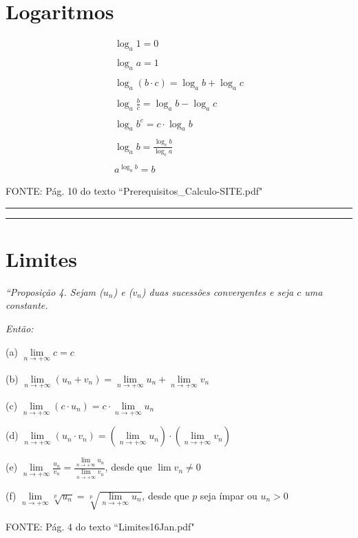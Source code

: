 \documentclass[portuguese,a4paper,12pt,onecolumn,fleqn]{article}
\newcommand{\myline}{\par
  \kern3pt %
  \hrule height 1.5pt
  \kern2pt %
  \hrule height 0.8pt
  \kern3pt %
}
\begin{document}
\section*{Logaritmos}

\begin{gather*}
\log_a 1 = 0
\\
\\
\log_a a = 1
\\
\\
\log_a (b \cdot c) = \log_a b + \log_a c
\\
\\
\log_a \frac{b}{c} = \log_a b - \log_a c
\\
\\
\log_a b^c = c \cdot \log_a b
\\
\\
\log_a b = \frac{\log_c b}{\log_c a}
\\
\\
a^{\log_a b} = b
\end{gather*}


FONTE: Pág. 10 do texto ``Prerequisitos\_Calculo-SITE.pdf"


\myline	%

\section*{Limites}

\textit{``Proposição 4. Sejam ($u_n$) e ($v_n$) duas sucessões convergentes e seja $c$ uma constante.}

\textit{Então:}

(a) $\lim\limits_{n \to +\infty} c = c$

(b) $\lim\limits_{n \to +\infty}(u_n + v_n ) = \lim\limits_{n \to +\infty}u_n + \lim\limits_{n \to +\infty}v_n$

(c) $\lim\limits_{n \to +\infty}(c \cdot u_n ) = c \cdot \lim\limits_{n \to +\infty}u_n$

(d) $\lim\limits_{n \to +\infty}(u_n \cdot v_n ) = (\lim\limits_{n \to +\infty}u_n) \cdot (\lim\limits_{n \to +\infty}v_n)$

(e)	$\lim\limits_{n \to +\infty}\frac{u_n}{v_n} = \frac{\lim\limits_{n \to +\infty}u_n}{\lim\limits_{n \to +\infty}v_n}$, 
desde que $\lim v_n \ne 0$

(f) $\lim\limits_{n \to +\infty}\sqrt[p]{u_n} = \sqrt[p]{\lim\limits_{n \to +\infty} u_n}$, desde que $p$ seja ímpar ou $u_n > 0$

FONTE: Pág. 4 do texto ``Limites16Jan.pdf"
\end{document}
